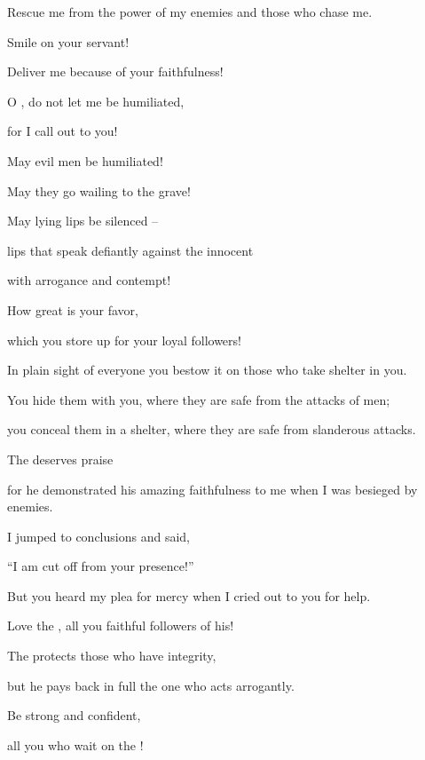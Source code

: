 {\par }{\Q Rescue
me from the power
of my enemies
and those who chase me.
\par }{\Q {}Smile
on
your servant!
\par }{\Q Deliver
me because of your faithfulness!
\par }{\Q {}O
{}, do not
let me be humiliated,
\par }{\Q for
I call
out to you!
\par }{\Q May evil
men be humiliated!
\par }{\Q May they go wailing
to the grave!
\par }{\Q {}May lying
lips
be silenced
–
\par }{\Q lips
that speak
defiantly
against
the innocent
\par }{\Q with arrogance
and contempt!
\par }{\Q {}How
great
is your favor,
\par }{\Q which
you store up
for your loyal followers!

\par }{\Q In plain sight of everyone you bestow
it on those who take shelter
in you.
\par }{\Q {}You hide
them with you, where they are safe
from the attacks
of men;
\par }{\Q you conceal
them in a shelter,
where they are safe from slanderous
attacks.
\par }{\Q {}The
{}
deserves
praise

\par }{\Q for
he demonstrated his amazing
faithfulness
to me when I was besieged by enemies.
\par }{\Q {}I
jumped to conclusions
and said,
\par }{\Q “I am cut off from your presence!”

\par }{\Q But
you heard
my plea
for mercy when I cried out
to you for help.
\par }{\Q {}Love
the {}, all
you faithful
followers
of his!
\par }{\Q The
{}
protects
those who have integrity,
\par }{\Q but he pays back
in
full
the one who acts
arrogantly.
\par }{\Q {}Be strong
and confident,
\par }{\Q all
you who wait
on the
{}!


}
